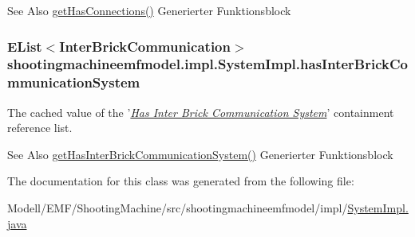 \begin{DoxySeeAlso}{See Also}
\hyperlink{classshootingmachineemfmodel_1_1impl_1_1_system_impl_a6573b6b1522a452bd631415525126000}{get\-Has\-Connections()} Generierter Funktionsblock  
\end{DoxySeeAlso}
\hypertarget{classshootingmachineemfmodel_1_1impl_1_1_system_impl_afa9091ffbd85dd16705ce7462c2c3286}{
\subsubsection[{has\-Inter\-Brick\-Communication\-System}]{\setlength{\rightskip}{0pt plus 5cm}E\-List$<${\bf Inter\-Brick\-Communication}$>$ shootingmachineemfmodel.\-impl.\-System\-Impl.\-has\-Inter\-Brick\-Communication\-System\hspace{0.3cm}{\ttfamily [protected]}}}\label{classshootingmachineemfmodel_1_1impl_1_1_system_impl_afa9091ffbd85dd16705ce7462c2c3286}
The cached value of the '\hyperlink{classshootingmachineemfmodel_1_1impl_1_1_system_impl_aeb13534d36d6f772d317c7c2c8b47241}{{\itshape Has Inter Brick Communication System}}' containment reference list.

\begin{DoxySeeAlso}{See Also}
\hyperlink{classshootingmachineemfmodel_1_1impl_1_1_system_impl_aeb13534d36d6f772d317c7c2c8b47241}{get\-Has\-Inter\-Brick\-Communication\-System()} Generierter Funktionsblock  
\end{DoxySeeAlso}


The documentation for this class was generated from the following file\-:\begin{DoxyCompactItemize}
\item 
Modell/\-E\-M\-F/\-Shooting\-Machine/src/shootingmachineemfmodel/impl/\hyperlink{_system_impl_8java}{System\-Impl.\-java}\end{DoxyCompactItemize}
